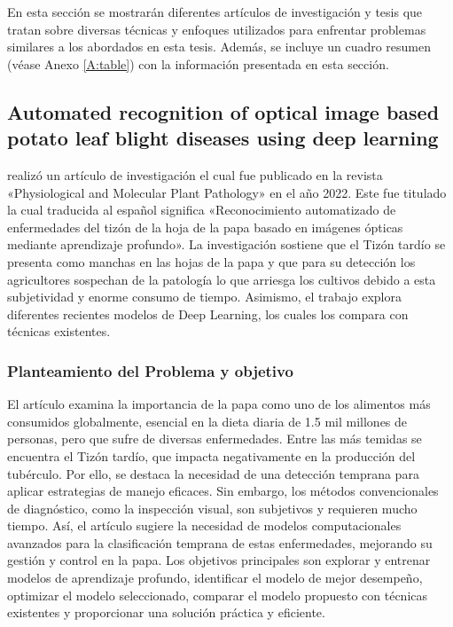 En esta sección se mostrarán diferentes artículos de investigación y tesis que tratan sobre diversas técnicas y enfoques utilizados para enfrentar problemas similares a los abordados en esta tesis. Además, se incluye un cuadro resumen (véase Anexo \ref{A:table}) con la información presentada en esta sección.


\subsection{Automated recognition of optical image based potato leaf blight diseases using deep learning \citep*{CHAKRABORTY2022101781}}

\citeauthor{CHAKRABORTY2022101781} realizó un artículo de investigación el cual fue publicado en la revista «Physiological and Molecular Plant Pathology» en el año 2022. 
Este fue titulado  la cual traducida al español significa «Reconocimiento automatizado de enfermedades del tizón de la hoja de la papa basado en imágenes ópticas mediante aprendizaje profundo». La investigación sostiene que el Tizón tardío se presenta como manchas en las hojas de la papa y que para su detección los agricultores sospechan de la patología lo que arriesga los cultivos debido a esta subjetividad y enorme consumo de tiempo. Asimismo, el trabajo explora diferentes recientes modelos de Deep Learning, los cuales los compara con técnicas existentes. 

\subsubsection{Planteamiento del Problema y objetivo }
El artículo examina la importancia de la papa como uno de los alimentos más consumidos globalmente, esencial en la dieta diaria de 1.5 mil millones de personas, pero que sufre de diversas enfermedades. Entre las más temidas se encuentra el Tizón tardío, que impacta negativamente en la producción del tubérculo. Por ello, se destaca la necesidad de una detección temprana para aplicar estrategias de manejo eficaces. Sin embargo, los métodos convencionales de diagnóstico, como la inspección visual, son subjetivos y requieren mucho tiempo. Así, el artículo sugiere la necesidad de modelos computacionales avanzados para la clasificación temprana de estas enfermedades, mejorando su gestión y control en la papa. Los objetivos principales son explorar y entrenar modelos de aprendizaje profundo, identificar el modelo de mejor desempeño, optimizar el modelo seleccionado, comparar el modelo propuesto con técnicas existentes y proporcionar una solución práctica y eficiente.


